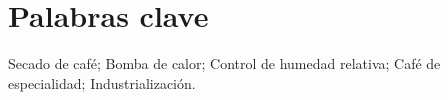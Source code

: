 \section{Palabras clave}

Secado de café; Bomba de calor; Control de humedad relativa; Café de especialidad; Industrialización.